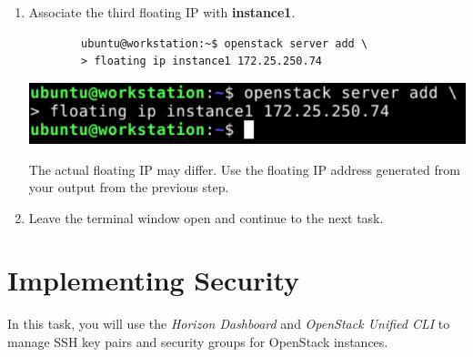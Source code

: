 \documentclass[letterpaper, 12pt]{article}
\begin{document}
\begin{enumerate}
    \item Associate the third floating IP with \textbf{instance1}.
    \begin{lstlisting}
        ubuntu@workstation:~$ openstack server add \
        > floating ip instance1 172.25.250.74
    \end{lstlisting}

    \begin{center}
        \includegraphics[width=\linewidth]{images/part3/step15.png}
    \end{center}

    \begin{notebox}
        The actual floating IP may differ. Use the floating IP address generated from your output from the previous
        step.
    \end{notebox}

    \item Leave the terminal window open and continue to the next task.

\end{enumerate}

\section{Implementing Security}
\label{sec:implementing_security}
In this task, you will use the \textit{Horizon Dashboard} and \textit{OpenStack Unified CLI} to manage SSH key pairs and
security groups for OpenStack instances.
\end{document}
